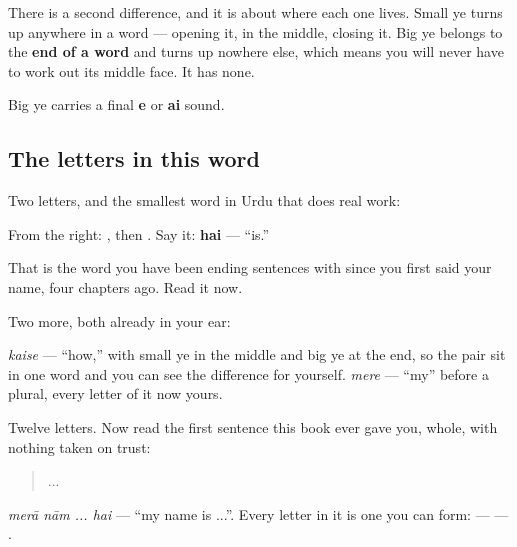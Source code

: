 There is a second difference, and it is about where each one lives. Small ye turns up anywhere in a word — opening it, in the middle, closing it. Big ye belongs to the \textbf{end of a word} and turns up nowhere else, which means you will never have to work out its middle face. It has none.

Big ye carries a final \textbf{e} or \textbf{ai} sound.

\subsection*{The letters in this word}
Two letters, and the smallest word in Urdu that does real work:

\begin{quote}
\end{quote}

From the right: \textbf{}, then \textbf{}. Say it: \textbf{hai} — \textquotedblleft{}is.\textquotedblright{}

That is the word you have been ending sentences with since you first said your name, four chapters ago. Read it now.

Two more, both already in your ear:

\begin{quote}
\end{quote}

\begin{quote}
\end{quote}

\textbf{} \emph{kaise} — \textquotedblleft{}how,\textquotedblright{} with small ye in the middle and big ye at the end, so the pair sit in one word and you can see the difference for yourself. \textbf{} \emph{mere} — \textquotedblleft{}my\textquotedblright{} before a plural, every letter of it now yours.

\begin{grammarlens}[title={What you've built}]
Twelve letters. Now read the first sentence this book ever gave you, whole, with nothing taken on trust:

\begin{quote}
  ... 
\end{quote}

\emph{merā nām ... hai} — \textquotedblleft{}my name is ...\textquotedblright{}. Every letter in it is one you can form: \textbf{   } — \textbf{  } — \textbf{ }.
\end{grammarlens}

